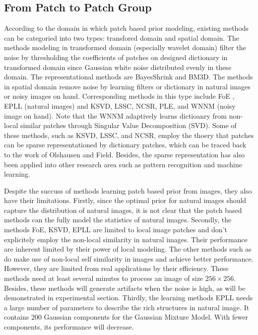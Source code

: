 \documentclass[10pt,twocolumn,letterpaper]{article}
\begin{document}
\subsection{From Patch to Patch Group}
According to the domain in which patch based prior modeling, existing methods can be categoried into two types: transfored domain and spatial domain. The methods modeling in transformed domain (especially wavelet domain) filter the noise by thresholding the coefficients of patches on designed dictionary in transformed domain since Gaussian white noise distributed evenly in these domain. The representational methods are BayesShrink\cite{bayesshrink} and BM3D\cite{bm3d}. The methods in spatial domain remove noise by learning filters or dictionary in natural images or noisy images on hand. Corresponding methods in this type include FoE \cite{foe}, EPLL\cite{epll} (natural images) and KSVD\cite{ksvd}, LSSC\cite{lssc}, NCSR\cite{ncsr}, PLE\cite{ygsgmm}, and WNNM\cite{wnnm} (noisy image on hand). Note that the WNNM adaptively learns dictioanry from non-local similar patches through Singular Value Decomposition (SVD). Some of these methods, such as KSVD\cite{ksvd}, LSSC\cite{lssc}, and NCSR\cite{ncsr}, employ the thoery that patches can be sparse representationed by dictionary patches, which can be traced back to the work of Olshausen and Field\cite{olshausen1996emergence,olshausen1997sparse}. Besides, the sparse representation has also been applied into other research area such as pattern recognition\cite{src,srcvpr} and machine learning\cite{mairal2010online}.

Despite the succuss of methods learning patch based prior from images\cite{foe,epll,ygsgmm,ksvd,lssc,ncsr,wnnm}, they also have their limitations. Firstly, since the optimal prior for natural images should capture the distribution of natural images, it is not clear that the patch based methods can the fully model the statistics of natural images\cite{weissfreeman,levin2012patch}. Secondly, the methods FoE\cite{foe}, KSVD\cite{ksvd}, EPLL\cite{epll} are limited to local image patches\cite{levin2012patch} and don't explicitely employ the non-local similarity in natural images. Their performance are inherent limited by their power of local modeling\cite{levin2012patch}. The other methods such as \cite{lssc,ncsr,wnnm} do make use of non-local self similarity in images and achieve better performance. However, they are limited from real applications by their efficiency. These methods need at least several minutes to process an image of size $256\times 256$. Besides, these methods will generate artifacts when the noise is high, as will be demonstrated in experimental section. Thirdly, the learning methods EPLL\cite{epll} needs a large number of parameters to describe the rich structures in natural image. It contains 200 Gaussian components for the Gaussian Mixture Model. With fewer components, its performance will decrease.
\end{document}
